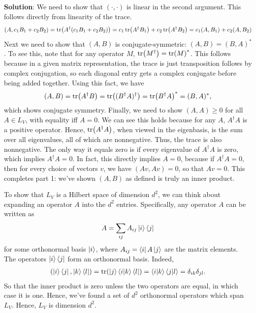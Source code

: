 \documentclass{book}
\begin{document}
    \textbf{Solution}: We need to show that $(\cdot, \cdot)$ is linear in the second argument. This follows directly from linearity of the trace.
    \begin{align}
        (A, c_1 B_1 + c_2 B_2) = \tr(A^\dagger (c_1 B_1 + c_2 B_2)) = c_1 \tr(A^\dagger B_1) + c_2 \tr(A^\dagger B_2) = c_1 (A,B_1) + c_2 (A, B_2)
    \end{align}
    Next we need to show that $(A,B)$ is conjugate-symmetric: $(A,B) = (B,A)^*$. To see this, note that for any operator $M$, $\tr(M^\dagger) = \tr(M)^*$. This follows because in a given matrix representation, the trace is just transposition follows by complex conjugation, so each diagonal entry gets a complex conjugate before being added together. Using this fact, we have
    \begin{align}
        (A, B) = \tr(A^\dagger B) = \tr((B^\dagger A)^\dagger) = \tr(B^\dagger A)^* = (B,A)^*,
    \end{align}
    which shows conjugate symmetry. Finally, we need to show $(A,A) \geq 0$ for all $A \in L_V$, with equality iff $A = 0$. We can see this holds because for any $A$, $A^\dagger A$ is a positive operator. Hence, $\tr(A^\dagger A)$, when viewed in the eigenbasis, is the sum over all eigenvalues, all of which are nonnegative. Thus, the trace is also nonnegative. The only way it equals zero is if every eigenvalue of $A^\dagger A$ is zero, which implies $A^\dagger A = 0$. In fact, this directly implies $A = 0$, because if $A^\dagger A = 0$, then for every choice of vectors $v$, we have $(Av, Av) = 0$, so that $Av = 0$. This completes part 1: we've shown $(A,B)$ as defined is truly an inner product.
    
    To show that $L_V$ is a Hilbert space of dimension $d^2$, we can think about expanding an operator $A$ into the $d^2$ entries. Specifically, any operator $A$ can be written as 
    \begin{align}
        A = \sum_{ij} A_{ij} \ket{i}\bra{j}
    \end{align}
    for some orthonormal basis $\ket{i}$, where $A_{ij} = \bra{i}A\ket{j}$ are the matrix elements. The operators $\ket{i}\bra{j}$ form an orthonormal basis. Indeed,
    \begin{align}
        (\ket{i}\bra{j}, \ket{k}\bra{l}) = \tr(\ket{j}\bra{i}\ket{k}\bra{l}) = \braket{i}{k} \braket{j}{l} = \delta_{ik}\delta_{jl}.
    \end{align}
    So that the inner product is zero unless the two operators are equal, in which case it is one. Hence, we've found a set of $d^2$ orthonormal operators which span $L_V$. Hence, $L_V$ is dimension $d^2$.
    
\end{document}
